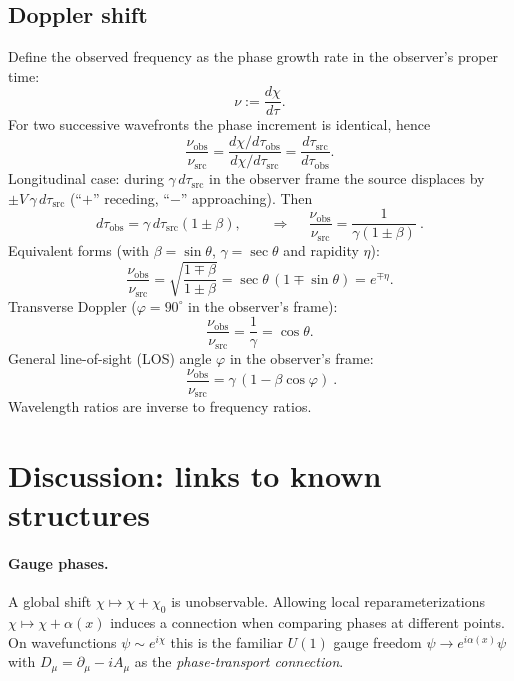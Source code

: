 \documentclass[11pt]{article}
\numberwithin{equation}{section}
\begin{document}
\subsection{Doppler shift}
Define the observed frequency as the phase growth rate in the observer's proper time:
\begin{equation}
\nu:=\frac{d\chi}{d\tau}.
\label{eq:381}
\end{equation}
For two successive wavefronts the phase increment is identical, hence
\begin{equation}
\frac{\nu_{\mathrm{obs}}}{\nu_{\mathrm{src}}}
=\frac{d\chi/d\tau_{\mathrm{obs}}}{d\chi/d\tau_{\mathrm{src}}}
=\frac{d\tau_{\mathrm{src}}}{d\tau_{\mathrm{obs}}}.
\label{eq:382}
\end{equation}
Longitudinal case: during $\gamma\,d\tau_{\mathrm{src}}$ in the observer frame the source displaces by $\pm V\,\gamma\,d\tau_{\mathrm{src}}$ (``$+$'' receding, ``$-$'' approaching). Then
\begin{equation}
d\tau_{\mathrm{obs}}=\gamma\,d\tau_{\mathrm{src}}(1\pm\beta),\qquad
\Rightarrow\quad
\boxed{\ \frac{\nu_{\mathrm{obs}}}{\nu_{\mathrm{src}}}=\frac{1}{\gamma(1\pm\beta)}\ }.
\label{eq:384}
\end{equation}
Equivalent forms (with $\beta=\sin\theta$, $\gamma=\sec\theta$ and rapidity $\eta$):
\begin{equation}
\frac{\nu_{\mathrm{obs}}}{\nu_{\mathrm{src}}}
=\sqrt{\frac{1\mp\beta}{1\pm\beta}}
=\sec\theta\,(1\mp\sin\theta)
=e^{\mp\eta}.
\label{eq:385}
\end{equation}
Transverse Doppler ($\varphi=90^\circ$ in the observer's frame):
\begin{equation}
\frac{\nu_{\mathrm{obs}}}{\nu_{\mathrm{src}}}=\frac{1}{\gamma}=\cos\theta.
\label{eq:389}
\end{equation}
General line-of-sight (LOS) angle $\varphi$ in the observer's frame:
\begin{equation}
\boxed{\ \frac{\nu_{\mathrm{obs}}}{\nu_{\mathrm{src}}}=\gamma\,(1-\beta\cos\varphi)\ }.
\label{eq:3810}
\end{equation}
Wavelength ratios are inverse to frequency ratios.

\section{Discussion: links to known structures}
\paragraph{Gauge phases.} A global shift $\chi\mapsto\chi+\chi_0$ is unobservable. Allowing local reparameterizations $\chi\mapsto\chi+\alpha(x)$ induces a connection when comparing phases at different points. On wavefunctions $\psi\sim e^{i\chi}$ this is the familiar $U(1)$ gauge freedom $\psi\to e^{i\alpha(x)}\psi$ with $D_\mu=\partial_\mu-iA_\mu$ as the \emph{phase-transport connection}.
\end{document}
